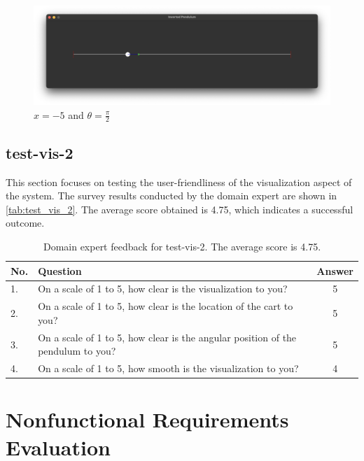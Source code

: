 \documentclass[12pt, titlepage]{article}
\begin{document}
\begin{figure}[h!]
  \begin{center}
    \includegraphics[width=\textwidth]{test_vis_1_4.png}
  \end{center}
  \caption{$x=-5$ and $\theta=\frac{\pi}{2}$}
  \label{fig:test_vis_1_4}
\end{figure}

\newpage

\subsection{test-vis-2}
This section focuses on testing the user-friendliness of the visualization aspect of the system. 
The survey results conducted by the domain expert are shown in \autoref{tab:test_vis_2}. 
The average score obtained is 4.75, which indicates a successful outcome.

\begin{table}[!h]
  \centering
  \caption{Domain expert feedback for test-vis-2. The average score is 4.75.}
  \label{tab:test_vis_2}
  \begin{tabular}{ p{0.5cm}|p{12cm}|c}
    \hline
    No. & Question                                                                        & Answer \\
    \hline
    1.  & On a scale of 1 to 5, how clear is the visualization to you?                    & 5      \\
    2.  & On a scale of 1 to 5, how clear is the location of the cart to you?             & 5      \\
    3.  & On a scale of 1 to 5, how clear is the angular position of the pendulum to you? & 5      \\
    4.  & On a scale of 1 to 5, how smooth is the visualization to you?                   & 4      \\
    \hline
  \end{tabular}
\end{table}

\section{Nonfunctional Requirements Evaluation}
\end{document}
